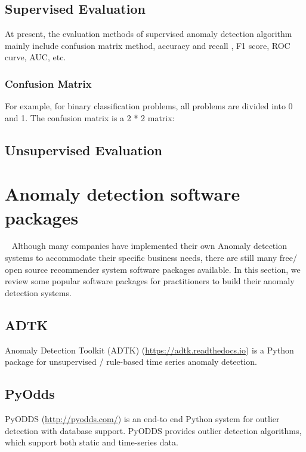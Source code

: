 \subsection{Supervised Evaluation}
At present, the evaluation methods of supervised 
anomaly detection algorithm mainly include 
confusion matrix method,
accuracy  and recall , 
F1 score, 
ROC curve, 
AUC, 
etc.
\subsubsection{Confusion Matrix}
For example, 
for binary classification problems, 
all problems are divided into 0 and 1. 
The confusion matrix is a 2 * 2 matrix:




\subsection{Unsupervised Evaluation}







\section{Anomaly detection software packages}~\label{sec:tools}
Although many companies have implemented their own Anomaly detection systems
to accommodate their specific business needs,
there are still many free/ open source recommender system
software packages available.
In this section,
we review some popular software packages for practitioners
to build their anomaly detection systems.

\subsection{ADTK}

Anomaly Detection Toolkit (ADTK) (\href{https://adtk.readthedocs.io}{https://adtk.readthedocs.io}) is a Python package for
unsupervised / rule-based time series anomaly detection.

\subsection{PyOdds}

PyODDS (\href{http://pyodds.com/}{http://pyodds.com/}) is an end-to end Python system for
outlier detection with database support.
PyODDS provides outlier detection algorithms,
which support both static and time-series data.

